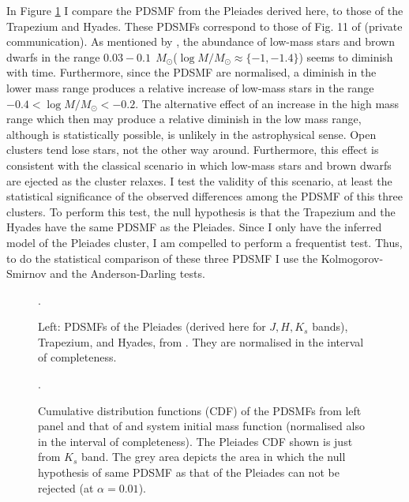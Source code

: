 In Figure \ref{fig:PDSMFcomparison} I compare the PDSMF from the Pleiades derived here, to those of the Trapezium and Hyades. These PDSMFs correspond to those of  Fig. 11 of \citet{Bouy2015} (private communication). As mentioned by \citet{Bouy2015}, the abundance of low-mass stars and brown dwarfs in the range $0.03 - 0.1 \ \ M_{\odot}$($\log M/M_{\odot} \approx \{-1, -1.4\}$) seems to diminish with time. Furthermore, since the PDSMF are normalised, a diminish in the lower mass range produces a relative increase of low-mass stars in the range $-0.4 < \log M/M_{\odot} < -0.2$. The alternative effect of an increase in the high mass range which then may produce a relative diminish in the low mass range, although is statistically possible, is unlikely in the astrophysical sense. Open clusters tend lose stars, not the other way around. Furthermore, this effect is consistent with the classical scenario in which low-mass stars and brown dwarfs are ejected as the cluster relaxes. I test the validity of this scenario, at least the statistical significance of the observed differences among the PDSMF of this three clusters. To perform this test, the null hypothesis is that the Trapezium and the Hyades have the same PDSMF as the Pleiades. Since I only have the inferred model of the Pleiades cluster, I am compelled to perform a frequentist test. Thus, to do the statistical comparison of these three PDSMF I use the Kolmogorov-Smirnov and the Anderson-Darling tests. 

\begin{figure}[htp]
\begin{center}
\caption{Left: PDSMFs of the Pleiades (derived here for $J,H,K_s$ bands), Trapezium, and Hyades, from \citet{Bouy2015}. They are normalised in the interval of completeness.}
\label{fig:PDSMFcomparison}.
\end{center}
\end{figure}

\begin{figure}[htp]
\begin{center}
\caption{Cumulative distribution functions (CDF) of the PDSMFs from left panel and that of \citet{Chabrier2005} and \citet{Thies2007} system initial mass function (normalised also in the interval of completeness). The Pleiades CDF shown is just from $K_s$ band. The grey area depicts the area in which the null hypothesis of same PDSMF as that of the Pleiades can not be rejected (at $\alpha=0.01$).}
\label{fig:PDSMFtest}.
\end{center}
\end{figure}


